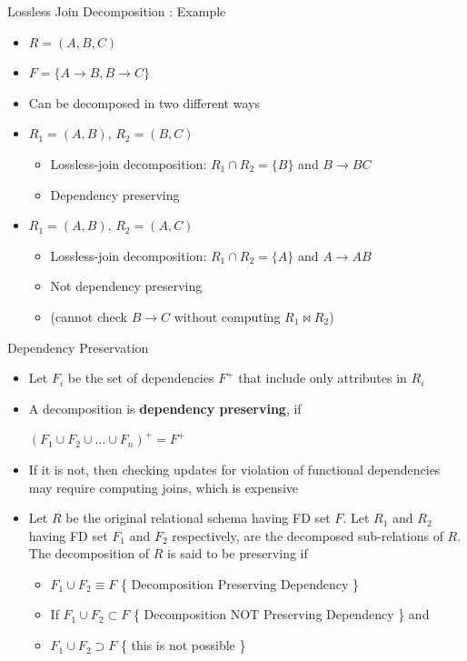 \documentclass[aspectratio=169, xcolor=dvipsnames]{beamer}
\begin{document}
\begin{frame}{Lossless Join Decomposition : Example}
    \begin{itemize}[<+->]
        \item $R = (A, B, C)$
        \item $F = \{A \rightarrow B, B \rightarrow C\}$
        \item Can be decomposed in two different ways
        \item $R_1 = (A, B)$, $R_2 = (B, C)$
        \begin{itemize}
            \item[$\triangleright$] Lossless-join decomposition: $R_1 \cap R_2 = \{B\}$ and $B \rightarrow BC$
            \item[$\triangleright$] Dependency preserving
        \end{itemize}
        \item $R_1 = (A, B)$, $R_2 = (A, C)$
        \begin{itemize}
            \item[$\triangleright$] Lossless-join decomposition: $R_1 \cap R_2 = \{A\}$ and $A \rightarrow AB$
            \item[$\triangleright$] Not dependency preserving
            \item[$\triangleright$] (cannot check $B \rightarrow C$ without computing $R_1 \bowtie R_2$)
        \end{itemize}
    \end{itemize}
\end{frame}

\begin{frame}{Dependency Preservation}
    \begin{itemize}[<+->]
        \item Let $F_i$ be the set of dependencies $F^+$ that include only attributes in $R_i$
        \item A decomposition is \textbf{dependency preserving}, if
        \begin{center}
            $(F_1 \cup F_2 \cup \dots \cup F_n)^+ = F^+$
        \end{center}
        \item If it is not, then checking updates for violation of functional dependencies may require computing joins, which is expensive
        \item Let $R$ be the original relational schema having FD set $F$. Let $R_1$ and $R_2$ having FD set $F_1$ and $F_2$ respectively, are the decomposed sub-relations of $R$. The decomposition of $R$ is said to be preserving if
        \begin{itemize}
            \item[$\triangleright$] $F_1 \cup F_2 \equiv F$ \{ Decomposition Preserving Dependency \}
            \item[$\triangleright$] If $F_1 \cup F_2 \subset F$ \{ Decomposition NOT Preserving Dependency \} and
            \item[$\triangleright$] $F_1 \cup F_2 \supset F$ \{ this is not possible \}
        \end{itemize}
    \end{itemize}
\end{frame}
\end{document}
